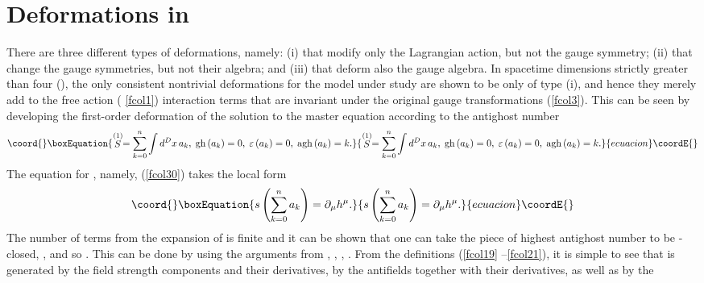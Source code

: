 \documentclass[a4paper,12pt]{article}
\begin{document}
\section{Deformations in \coordHE{}}

There are three different types of deformations, namely: (i) that modify
only the Lagrangian action, but not the gauge symmetry; (ii) that change the
gauge symmetries, but not their algebra; and (iii) that deform also the
gauge algebra. In spacetime dimensions strictly greater than four (\coordHE{}),
the only consistent nontrivial deformations for the model under study are
shown to be only of type (i), and hence they merely add to the free action (%
\ref{fcol1}) interaction terms that are invariant under the original gauge
transformations (\ref{fcol3}). This can be seen by developing the
first-order deformation of the solution to the master equation according to
the antighost number 
\begin{equation}\coord{}\boxEquation{
\stackrel{(1)}{S}=\sum_{k=0}^{n}\int d^{D}x\,a_{k},\;\mathrm{gh}\left(
a_{k}\right) =0,\;\varepsilon \left( a_{k}\right) =0,\;\mathrm{agh}\left(
a_{k}\right) =k.  \label{fcoli1}
}{
\stackrel{(1)}{S}=\sum_{k=0}^{n}\int d^{D}x\,a_{k},\;\mathrm{gh}\left(
a_{k}\right) =0,\;\varepsilon \left( a_{k}\right) =0,\;\mathrm{agh}\left(
a_{k}\right) =k.  }{ecuacion}\coordE{}\end{equation}
The equation for \coordHE{}, namely, (\ref{fcol30}) takes the local
form 
\begin{equation}\coord{}\boxEquation{
s\left( \sum_{k=0}^{n}a_{k}\right) =\partial _{\mu }h^{\mu }.  \label{fcoli2}
}{
s\left( \sum_{k=0}^{n}a_{k}\right) =\partial _{\mu }h^{\mu }.  }{ecuacion}\coordE{}\end{equation}
The number of terms from the expansion of \coordHE{} is finite and
it can be shown that one can take the piece of highest antighost number to
be \myHighlight{$\gamma $}\coordHE{}-closed, \coordHE{}, and so \coordHE{}. This can be done by using the arguments from \cite{7and23}, \cite
{23and6}, \cite{32and12}, \cite{36and14}. From the definitions (\ref{fcol19}%
--\ref{fcol21}), it is simple to see that \coordHE{} is
generated by the field strength components \coordHE{} and their derivatives, by the antifields \myHighlight{$\Phi
_{\Delta }^{*}$}\coordHE{} together with their derivatives, as well as by the
\end{document}
